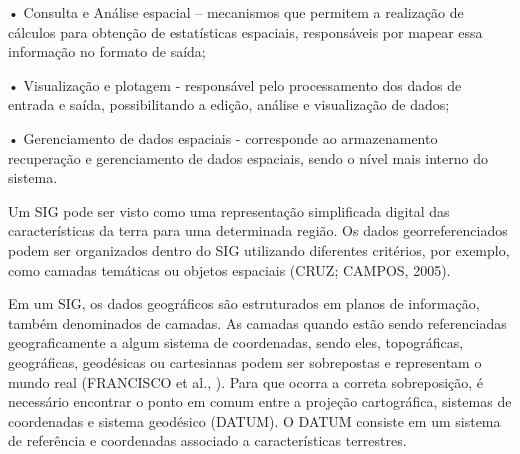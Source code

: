 \documentclass[
	12pt,				%
    oneside,			%
	a4paper,			%
	english,			%
	french,				%
	spanish,			%
	brazil,				%
	]{abntex2}
\begin{document}
•	Consulta e Análise espacial – mecanismos que permitem a realização de cálculos para obtenção de estatísticas espaciais, responsáveis por mapear essa informação no formato de saída;

•	Visualização e plotagem -  responsável pelo processamento dos dados de entrada e saída, possibilitando a edição, análise e visualização de dados;

•	Gerenciamento de dados espaciais -  corresponde ao armazenamento recuperação e gerenciamento de dados espaciais, sendo o nível mais interno do sistema.

Um SIG pode ser visto como uma representação simplificada digital das características da terra para uma determinada região. Os dados georreferenciados podem ser organizados dentro do SIG utilizando diferentes critérios, por exemplo, como camadas temáticas ou objetos espaciais (CRUZ; CAMPOS, 2005).

Em um SIG, os dados geográficos são estruturados em planos de informação, também denominados de camadas. As camadas quando estão sendo referenciadas geograficamente a algum sistema de coordenadas, sendo eles, topográficas, geográficas, geodésicas ou cartesianas podem ser sobrepostas e representam o mundo real (FRANCISCO et al.,  ). Para que ocorra a correta sobreposição, é necessário encontrar o ponto em comum entre a projeção cartográfica, sistemas de coordenadas e sistema geodésico (DATUM). O DATUM consiste em um sistema de referência e coordenadas associado a características terrestres.
\end{document}
